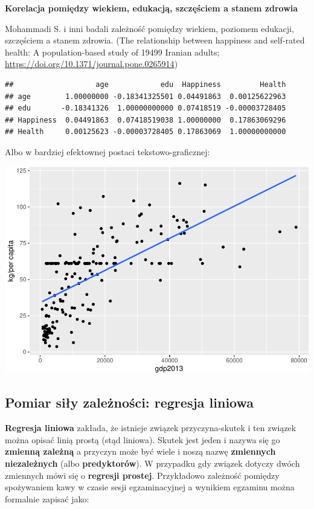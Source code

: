 \documentclass[
  openany]{book}
\begin{document}
\begin{example}
\textbf{Korelacja pomiędzy wiekiem, edukacją, szczęściem a stanem zdrowia}

Mohammadi S. i inni badali zależność pomiędzy wiekiem, poziomem edukacji, szczęściem a stanem zdrowia.
(The relationship between happiness and self-rated health: A population-based study of 19499 Iranian adults;
\url{https://doi.org/10.1371/journal.pone.0265914})

\begin{verbatim}
##                   age            edu  Happiness         Health
## age        1.00000000 -0.18341325501 0.04491863  0.00125622963
## edu       -0.18341326  1.00000000000 0.07418519 -0.00003728405
## Happiness  0.04491863  0.07418519038 1.00000000  0.17863069296
## Health     0.00125623 -0.00003728405 0.17863069  1.00000000000
\end{verbatim}

Albo w bardziej efektownej postaci tekstowo-graficznej:

\includegraphics{_main_files/figure-latex/unnamed-chunk-59-1.pdf}
\end{example}

\hypertarget{pomiar-siux142y-zaleux17cnoux15bci-regresja-liniowa}{%
\subsection{Pomiar siły zależności: regresja liniowa}\label{pomiar-siux142y-zaleux17cnoux15bci-regresja-liniowa}}

\textbf{Regresja liniowa} zakłada, że istnieje związek przyczyna-skutek
i ten związek można opisać linią prostą (stąd liniowa). Skutek jest
jeden i nazywa się go \textbf{zmienną zależną} a przyczyn może być wiele i noszą
nazwę \textbf{zmiennych niezależnych} (albo \textbf{predyktorów}).
W przypadku gdy związek dotyczy dwóch zmiennych mówi się o \textbf{regresji prostej}.
Przykładowo zależność
pomiędzy spożywaniem kawy w czasie sesji egzaminacyjnej a wynikiem egzaminu
można formalnie zapisać jako:
\end{document}

